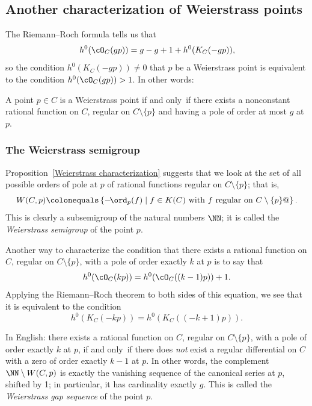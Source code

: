 \subsection*{Another characterization of Weierstrass points}

The
Riemann--Roch formula
%
tells us that
$$
h^0(\cO_C(gp)) = g - g + 1 + h^0(K_C(-gp))
,
$$
so the condition $h^0(K_C(-gp)) \neq 0$ that $p$ be a Weierstrass point is
equivalent to the condition $h^0(\cO_C(gp)) > 1$. In other words:

\begin{proposition}\label{Weierstrass characterization}
A point $p \in C$ is a Weierstrass point if and only~if there exists
a nonconstant rational function on $C$, regular on $C \setminus \{p\}$
and having a pole of order at most $g$ at $p$.
\unif
\end{proposition}

\subsubsection*{The Weierstrass semigroup}

Proposition~\ref{Weierstrass characterization} suggests that we look
at the set of all possible orders of pole at $p$ of rational functions
regular on $C \setminus \{p\}$; that is,
$$
W(C,p) \colonequals  \left\{ -\! %
\ord_p(f) \mid f \in K(C) \text{ with $f$
regular on } C \setminus \{p\} @\right\}.
$$
This is clearly a subsemigroup of the natural numbers $\NN$; it is
%
called the \emph{Weierstrass semigroup} of the point $p$.

Another way to characterize the condition that there exists a rational
function on $C$, regular on $C \setminus \{p\}$, with a pole of order
exactly $k$ at $p$ is to say that
$$
h^0(\cO_C(kp)) = h^0(\cO_C((k-1)p)) + 1.
$$
Applying
the Riemann--Roch theorem
%
to both sides of this equation, we see that it is equivalent to the
condition
$$
h^0(K_C(-kp)) = h^0(K_C((-k+1)p)).
$$

In English: there exists a rational function on $C$, regular on $C
\setminus \{p\}$, with a pole of order exactly $k$ at $p$, if and only~if
there does \emph{not} exist a regular differential on $C$ with a zero
of order exactly $k-1$ at $p$.
In other words, the complement $\NN \setminus W(C,p)$ is exactly
the vanishing sequence of the canonical series at $p$, shifted by 1;
in particular, it has cardinality  exactly $g$. This is called the
%
\emph{Weierstrass gap sequence} of the point $p$.


